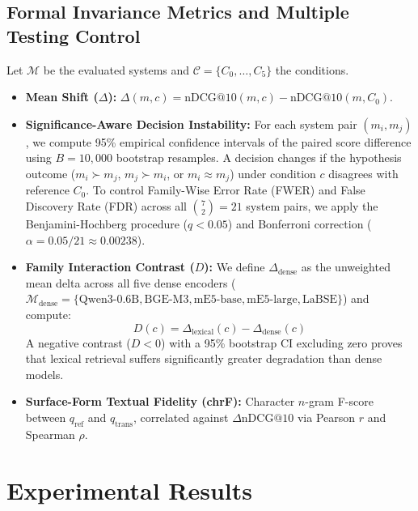 \documentclass[runningheads]{llncs}
\begin{document}
\subsection{Formal Invariance Metrics and Multiple Testing Control}
Let $\mathcal{M}$ be the evaluated systems and $\mathcal{C} = \{C_0, \dots, C_5\}$ the conditions.
\begin{itemize}
    \item \textbf{Mean Shift ($\Delta$):} $\Delta(m, c) = \text{nDCG@10}(m, c) - \text{nDCG@10}(m, C_0)$.
    \item \textbf{Significance-Aware Decision Instability:} For each system pair $(m_i, m_j)$, we compute 95\% empirical confidence intervals of the paired score difference using $B = 10{,}000$ bootstrap resamples. A decision changes if the hypothesis outcome ($m_i \succ m_j$, $m_j \succ m_i$, or $m_i \approx m_j$) under condition $c$ disagrees with reference $C_0$. To control Family-Wise Error Rate (FWER) and False Discovery Rate (FDR) across all $\binom{7}{2} = 21$ system pairs, we apply the Benjamini-Hochberg procedure ($q < 0.05$) and Bonferroni correction ($\alpha = 0.05 / 21 \approx 0.00238$).
    \item \textbf{Family Interaction Contrast ($D$):} We define $\Delta_{\text{dense}}$ as the unweighted mean delta across all five dense encoders ($\mathcal{M}_{\text{dense}} = \{\text{Qwen3-0.6B}, \text{BGE-M3}, \text{mE5-base}, \text{mE5-large}, \text{LaBSE}\}$) and compute:
    \begin{equation}
    D(c) = \Delta_{\text{lexical}}(c) - \Delta_{\text{dense}}(c)
    \end{equation}
    A negative contrast ($D < 0$) with a 95\% bootstrap CI excluding zero proves that lexical retrieval suffers significantly greater degradation than dense models.
    \item \textbf{Surface-Form Textual Fidelity (chrF):} Character $n$-gram F-score~\cite{popovic2015chrf} between $q_{\text{ref}}$ and $q_{\text{trans}}$, correlated against $\Delta\text{nDCG@10}$ via Pearson $r$ and Spearman $\rho$.
\end{itemize}

\section{Experimental Results}
\label{sec:results}
\end{document}
